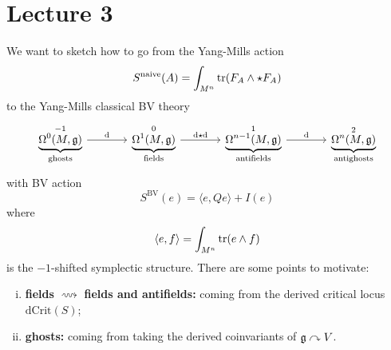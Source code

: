 \chapter{Lecture 3}

We want to sketch how to go from the Yang-Mills action
\begin{equation*}
  S^{\text{naive}} (A) = \int_{M^n} \operatorname{tr} (F_A \wedge \star F_A)
\end{equation*}
to the Yang-Mills classical BV theory
\begin{equation*}
  \begin{tikzcd}[sep=large]
    \underbrace{\Omega^0 (M, \gfrak)}_{\text{ghosts}}^{-1}
    \arrow[r, "\drm"] &
    \underbrace{\Omega^1 (M, \gfrak)}_{\text{fields}}^{0}
    \arrow[r, "\drm \star \drm"] &
    \underbrace{\Omega^{n-1} (M, \gfrak)}_{\text{antifields}}^{1}
    \arrow[r, "\drm"] &
    \underbrace{\Omega^n (M, \gfrak)}_{\text{antighosts}}^{2}
  \end{tikzcd}
\end{equation*}
with BV action
\begin{equation*}
  S^{\text{BV}}(e) = \langle e, Q e \rangle + I(e)
\end{equation*}
where
\begin{equation*}
  \langle e, f \rangle = \int_{M^n} \operatorname{tr} (e \wedge f)
\end{equation*}
is the $-1$-shifted symplectic structure. There are some points to motivate:
\begin{enumerate}[i)]
  \item \textbf{fields} $\longrightsquigarrow$ \textbf{fields and antifields:} coming from the derived critical locus $\text{dCrit}(S)$;
  \item \textbf{ghosts:} coming from taking the derived coinvariants of $\mathfrak{g} \curvearrowright V$.
\end{enumerate}


